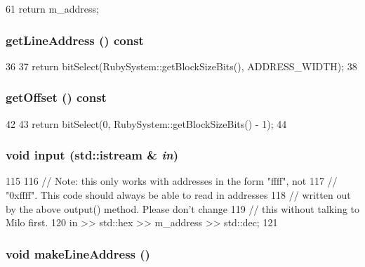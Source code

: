 \begin{DoxyCode}
61 {return m_address;}
\end{DoxyCode}
\hypertarget{classAddress_a3d5e121d4366c4cba97dbb38ad2f8b00}{
\subsubsection[{getLineAddress}]{ getLineAddress () const}}
\label{classAddress_a3d5e121d4366c4cba97dbb38ad2f8b00}



\begin{DoxyCode}
36 {
37     return bitSelect(RubySystem::getBlockSizeBits(), ADDRESS_WIDTH);
38 }
\end{DoxyCode}
\hypertarget{classAddress_a7f7b431504ce24277fd98a99a51e7865}{
\subsubsection[{getOffset}]{ getOffset () const}}
\label{classAddress_a7f7b431504ce24277fd98a99a51e7865}



\begin{DoxyCode}
42 {
43     return bitSelect(0, RubySystem::getBlockSizeBits() - 1);
44 }
\end{DoxyCode}
\hypertarget{classAddress_a62ef2ea8dd5db08546872dab6ed957ff}{
\subsubsection[{input}]{\setlength{\rightskip}{0pt plus 5cm}void input (std::istream \& {\em in})}}
\label{classAddress_a62ef2ea8dd5db08546872dab6ed957ff}



\begin{DoxyCode}
115 {
116     // Note: this only works with addresses in the form "ffff", not
117     // "0xffff".  This code should always be able to read in addresses
118     // written out by the above output() method.  Please don't change
119     // this without talking to Milo first.
120     in >> std::hex >> m_address >> std::dec;
121 }
\end{DoxyCode}
\hypertarget{classAddress_a16ec7c723f772ab7bee0af7d2e7a4305}{
\subsubsection[{makeLineAddress}]{\setlength{\rightskip}{0pt plus 5cm}void makeLineAddress ()}}
\label{classAddress_a16ec7c723f772ab7bee0af7d2e7a4305}



